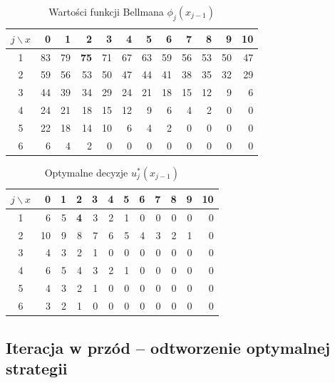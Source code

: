 \documentclass[12pt,a4paper]{article}
\begin{document}
\begin{table}[H]
    \centering
    \caption{Warto\'sci funkcji Bellmana $\phi_j(x_{j-1})$}
    \label{tab:phi}
    \footnotesize
    \setlength{\tabcolsep}{5pt}
    \begin{tabular}{c|rrrrrrrrrrr}
        \toprule
        $j \backslash x$ & 0 & 1 & 2 & 3 & 4 & 5 & 6 & 7 & 8 & 9 & 10 \\
        \midrule
        1 & 83 & 79 & \textbf{75} & 71 & 67 & 63 & 59 & 56 & 53 & 50 & 47 \\
        2 & 59 & 56 & 53 & 50 & 47 & 44 & 41 & 38 & 35 & 32 & 29 \\
        3 & 44 & 39 & 34 & 29 & 24 & 21 & 18 & 15 & 12 &  9 &  6 \\
        4 & 24 & 21 & 18 & 15 & 12 &  9 &  6 &  4 &  2 &  0 &  0 \\
        5 & 22 & 18 & 14 & 10 &  6 &  4 &  2 &  0 &  0 &  0 &  0 \\
        6 &  6 &  4 &  2 &  0 &  0 &  0 &  0 &  0 &  0 &  0 &  0 \\
        \bottomrule
    \end{tabular}
\end{table}

\begin{table}[H]
    \centering
    \caption{Optymalne decyzje $u_j^*(x_{j-1})$}
    \label{tab:uopt}
    \footnotesize
    \setlength{\tabcolsep}{5pt}
    \begin{tabular}{c|rrrrrrrrrrr}
        \toprule
        $j \backslash x$ & 0 & 1 & 2 & 3 & 4 & 5 & 6 & 7 & 8 & 9 & 10 \\
        \midrule
        1 &  6 &  5 & \textbf{4} &  3 &  2 &  1 &  0 &  0 &  0 &  0 &  0 \\
        2 & 10 &  9 &  8 &  7 &  6 &  5 &  4 &  3 &  2 &  1 &  0 \\
        3 &  4 &  3 &  2 &  1 &  0 &  0 &  0 &  0 &  0 &  0 &  0 \\
        4 &  6 &  5 &  4 &  3 &  2 &  1 &  0 &  0 &  0 &  0 &  0 \\
        5 &  4 &  3 &  2 &  1 &  0 &  0 &  0 &  0 &  0 &  0 &  0 \\
        6 &  3 &  2 &  1 &  0 &  0 &  0 &  0 &  0 &  0 &  0 &  0 \\
        \bottomrule
    \end{tabular}
\end{table}

\subsection{Iteracja w prz\'od -- odtworzenie optymalnej strategii}
\end{document}
